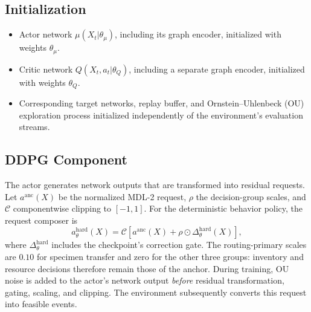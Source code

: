 \documentclass[preprint,review,12pt]{elsarticle}
\begin{document}
\subsection*{Initialization}
\begin{itemize}
\item Actor network \( \mu(X_t|\theta_\mu) \), including its graph encoder, initialized with weights \( \theta_\mu \).
\item Critic network \( Q(X_t, a_t|\theta_Q) \), including a separate graph encoder, initialized with weights \( \theta_Q \).
\item Corresponding target networks, replay buffer, and Ornstein--Uhlenbeck (OU) exploration process initialized independently of the environment's evaluation streams.
\end{itemize}

\subsection*{DDPG Component}
The actor generates network outputs that are transformed into residual requests.
Let $a^{\mathrm{anc}}(X)$ be the normalized MDL-2 request, $\rho$ the
decision-group scales, and $\mathcal{C}$ componentwise clipping to $[-1,1]$.
For the deterministic behavior policy, the request composer is
\begin{equation}
a^{\mathrm{hard}}_\theta(X)=\mathcal{C}\!\left[
a^{\mathrm{anc}}(X)+\rho\odot\Delta^{\mathrm{hard}}_\theta(X)\right],
\end{equation}
where $\Delta^{\mathrm{hard}}_\theta$ includes the checkpoint's correction gate.
The routing-primary scales are $0.10$ for specimen transfer and zero for the
other three groups: inventory and resource decisions therefore remain those
of the anchor. During training, OU noise is added to the actor's network
output \emph{before} residual transformation, gating, scaling, and clipping.
The environment subsequently converts this request into feasible events.
\end{document}
